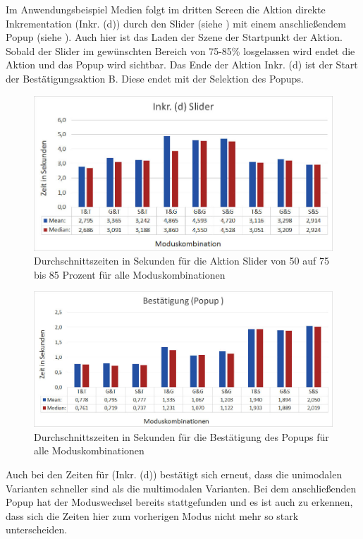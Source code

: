 Im Anwendungsbeispiel Medien folgt im dritten Screen die Aktion direkte Inkrementation (Inkr. (d)) durch den Slider (siehe ) mit einem anschließendem Popup (siehe ). 
Auch hier ist das Laden der Szene der Startpunkt der Aktion. 
Sobald der Slider im gewünschten Bereich von 75-85\% losgelassen wird endet die Aktion und das Popup wird sichtbar. 
Das Ende der Aktion Inkr. (d) ist der Start der Bestätigungsaktion B. 
Diese endet mit der Selektion des Popups.
\begin{figure}[ht]
  \centering
  \includegraphics[width=1\textwidth]{img/Slider.JPG}
  \caption[Durchschnittszeiten für Inkr. (d)]{Durchschnittszeiten in Sekunden für die Aktion Slider von 50 auf 75 bis 85 Prozent für alle Moduskombinationen}
  \label{fig:Slider}
\end{figure} 
\begin{figure}[ht]
  \centering
  \includegraphics[width=1\textwidth]{img/PopupBestaetigung.JPG}
  \caption[Durchschnittszeiten für die Bestätigung des Popups]{Durchschnittszeiten in Sekunden für die Bestätigung des Popups für alle Moduskombinationen}
  \label{fig:Popup}
\end{figure} 
Auch bei den Zeiten für (Inkr. (d)) bestätigt sich erneut, dass die unimodalen Varianten schneller sind als die multimodalen Varianten. 
Bei dem anschließenden Popup hat der Moduswechsel bereits stattgefunden und es ist auch zu erkennen, dass sich die Zeiten hier zum vorherigen Modus nicht mehr so stark unterscheiden.

